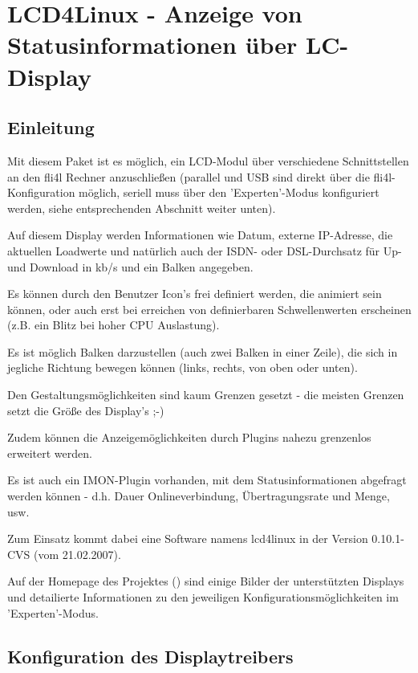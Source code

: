 {
  \section {LCD4Linux - Anzeige von Statusinformationen über LC-Display}
}

\subsection{Einleitung}

    Mit diesem Paket ist es möglich, ein LCD-Modul über verschiedene 
    Schnittstellen an den fli4l Rechner anzuschließen 
    (parallel und USB sind direkt über die fli4l-Konfiguration möglich, 
    seriell muss über den 'Experten'-Modus konfiguriert werden, siehe 
    entsprechenden Abschnitt weiter unten).

    Auf diesem Display werden Informationen wie Datum, externe IP-Adresse, 
    die aktuellen Loadwerte und natürlich auch der ISDN- oder DSL-Durchsatz 
    für Up- und Download in kb/s und ein Balken angegeben.

    Es können durch den Benutzer Icon's frei definiert werden, die animiert sein 
    können, oder auch erst bei erreichen von definierbaren Schwellenwerten 
    erscheinen (z.B. ein Blitz bei hoher CPU Auslastung).

    Es ist möglich Balken darzustellen (auch zwei Balken in einer Zeile), die 
    sich in jegliche Richtung bewegen können (links, rechts, von oben oder unten).

    Den Gestaltungsmöglichkeiten sind kaum Grenzen gesetzt - die meisten Grenzen 
    setzt die Größe des Display's ;-)

    Zudem können die Anzeigemöglichkeiten durch Plugins nahezu grenzenlos 
    erweitert werden.

    Es ist auch ein IMON-Plugin vorhanden, mit dem Statusinformationen abgefragt 
    werden können - d.h. Dauer Onlineverbindung, Übertragungsrate und Menge, usw.

    Zum Einsatz kommt dabei eine Software namens lcd4linux in der 
    Version 0.10.1-CVS (vom 21.02.2007).

    Auf der Homepage des Projektes
    	()
    sind einige Bilder der unterstützten Displays und detailierte Informationen
    zu den jeweiligen Konfigurationsmöglichkeiten im 'Experten'-Modus.


\subsection{Konfiguration des Displaytreibers}

